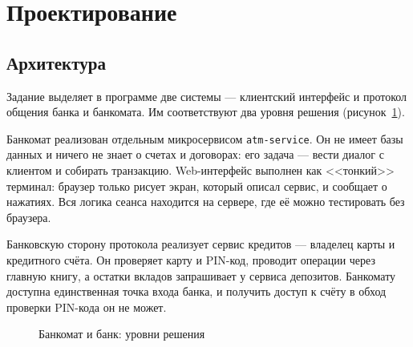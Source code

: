 \documentclass[14pt,a4paper]{extarticle}
\begin{document}
\section{Проектирование}

\subsection{Архитектура}

Задание выделяет в программе две системы --- клиентский интерфейс и протокол общения
банка и банкомата. Им соответствуют два уровня решения (рисунок~\ref{fig:arch}).

Банкомат реализован отдельным микросервисом \texttt{atm-service}. Он не имеет базы данных
и ничего не знает о счетах и договорах: его задача --- вести диалог с клиентом и собирать
транзакцию. Web-интерфейс выполнен как <<тонкий>> терминал: браузер только рисует экран,
который описал сервис, и сообщает о нажатиях. Вся логика сеанса находится на сервере, где её
можно тестировать без браузера.

Банковскую сторону протокола реализует сервис кредитов --- владелец карты и кредитного
счёта. Он проверяет карту и PIN-код, проводит операции через главную книгу, а остатки
вкладов запрашивает у сервиса депозитов. Банкомату доступна единственная точка входа банка,
и получить доступ к счёту в обход проверки PIN-кода он не может.

\begin{figure}[H]
\centering
{}
\caption{Банкомат и банк: уровни решения}
\label{fig:arch}
\end{figure}
\end{document}
